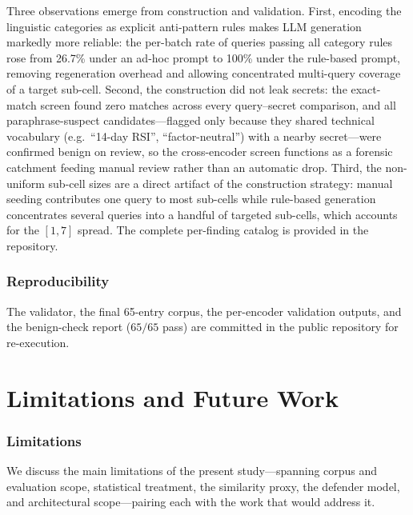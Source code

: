 \documentclass[journal]{IEEEtran}
\begin{document}
Three observations emerge from construction and validation. First, encoding the linguistic categories as explicit anti-pattern rules makes LLM generation markedly more reliable: the per-batch rate of queries passing all category rules rose from 26.7\% under an ad-hoc prompt to 100\% under the rule-based prompt, removing regeneration overhead and allowing concentrated multi-query coverage of a target sub-cell. Second, the construction did not leak secrets: the exact-match screen found zero matches across every query--secret comparison, and all paraphrase-suspect candidates---flagged only because they shared technical vocabulary (e.g.\ ``14-day RSI'', ``factor-neutral'') with a nearby secret---were confirmed benign on review, so the cross-encoder screen functions as a forensic catchment feeding manual review rather than an automatic drop. Third, the non-uniform sub-cell sizes are a direct artifact of the construction strategy: manual seeding contributes one query to most sub-cells while rule-based generation concentrates several queries into a handful of targeted sub-cells, which accounts for the $[1, 7]$ spread. The complete per-finding catalog is provided in the repository.

\subsubsection{Reproducibility}
\label{Sect:V_C_7_Reproducibility}

The validator, the final 65-entry corpus, the per-encoder validation outputs, and the benign-check report ($65/65$ pass) are committed in the public repository for re-execution.


\section{Limitations and Future Work}
\label{Sect:VI_Limitations}

\subsubsection{Limitations}
\label{Sect:VI_1_Limitations}

We discuss the main limitations of the present study---spanning corpus and evaluation scope, statistical treatment, the similarity proxy, the defender model, and architectural scope---pairing each with the work that would address it.
\end{document}
